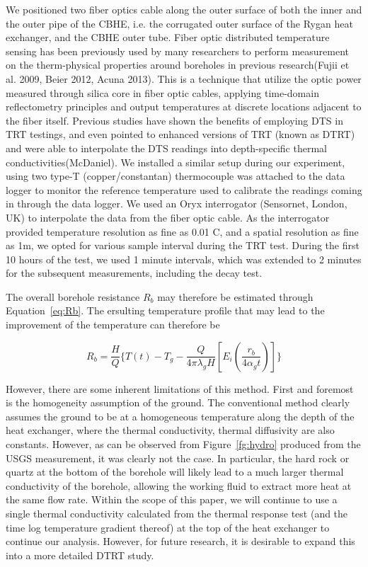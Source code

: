 	We positioned two fiber optics cable along the outer surface of both the inner and the outer pipe of the CBHE, i.e. the corrugated outer surface of the Rygan heat exchanger, and the CBHE outer tube. Fiber optic distributed temperature sensing has been previously used by many researchers to perform measurement on the therm-physical properties around boreholes in previous research(Fujii et al. 2009, Beier 2012, Acuna 2013). This is a technique that utilize the optic power measured through silica core in fiber optic cables, applying time-domain reflectometry principles and output temperatures at discrete locations adjacent to the fiber itself. Previous studies have shown the benefits of employing DTS in TRT testings, and even pointed to enhanced versions of TRT (known as DTRT) and were able to interpolate the DTS readings into depth-specific thermal conductivities(McDaniel). We installed a similar setup during our experiment, using two type-T (copper/constantan) thermocouple was attached to the data logger to monitor the reference temperature used to calibrate the readings coming in through the data logger. We used an Oryx interrogator (Sensornet, London, UK) to interpolate the data from the fiber optic cable. As the interrogator provided temperature resolution as fine as 0.01 C, and a spatial resolution as fine as 1m, we opted for various sample interval during the TRT test. During the first 10 hours of the test, we used 1 minute intervals, which was extended to 2 minutes for the subsequent measurements, including the decay test.


	The overall borehole resistance $R_b$ may therefore be estimated through Equation~\ref{eq:Rb}\cite{beier_situ_2012}. The ersulting temperature profile that may lead to the improvement of the temperature can therefore be

	\begin{equation}
		R_b = \frac{H}{Q}\{ T(t) - T_g -\frac{Q}{4\pi \lambda_g H} [E_i(\frac{r_b}{4 \alpha_g t})]   \}\label{eq:Rb}
	\end{equation}

	However, there are some inherent limitations of this method. First and foremost is the homogeneity assumption of the ground. The conventional method clearly assumes the ground to be at a homogeneous temperature along the depth of the heat exchanger, where the thermal conductivity, thermal diffusivity are also constants. However, as can be observed from Figure~\ref{fg:hydro} produced from the USGS measurement, it was clearly not the case. In particular, the hard rock or quartz at the bottom of the borehole will likely lead to a much larger thermal conductivity of the borehole, allowing the working fluid to extract more heat at the same flow rate. Within the scope of this paper, we will continue to use a single thermal conductivity calculated from the thermal response test (and the time log temperature gradient thereof) at the top of the heat exchanger to continue our analysis. However, for future research, it is desirable to expand this into a more detailed DTRT study.

